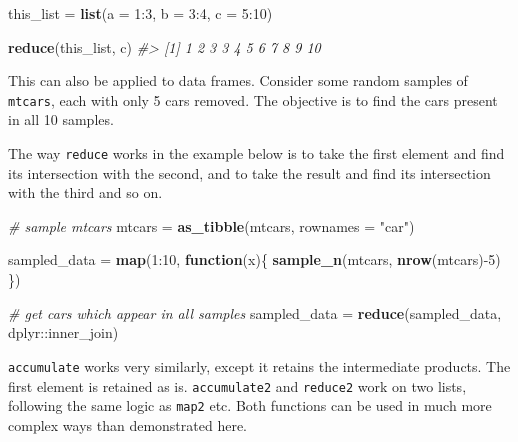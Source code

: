 \documentclass[]{book}
\newenvironment{Shaded}{}{}
\newcommand{\CommentTok}[1]{\textcolor[rgb]{0.38,0.63,0.69}{\textit{#1}}}
\newcommand{\ControlFlowTok}[1]{\textcolor[rgb]{0.00,0.44,0.13}{\textbf{#1}}}
\newcommand{\DataTypeTok}[1]{\textcolor[rgb]{0.56,0.13,0.00}{#1}}
\newcommand{\DecValTok}[1]{\textcolor[rgb]{0.25,0.63,0.44}{#1}}
\newcommand{\KeywordTok}[1]{\textcolor[rgb]{0.00,0.44,0.13}{\textbf{#1}}}
\newcommand{\NormalTok}[1]{#1}
\newcommand{\OperatorTok}[1]{\textcolor[rgb]{0.40,0.40,0.40}{#1}}
\newcommand{\StringTok}[1]{\textcolor[rgb]{0.25,0.44,0.63}{#1}}
\begin{document}
\begin{Shaded}
\begin{Highlighting}[]
\NormalTok{this_list =}\StringTok{ }\KeywordTok{list}\NormalTok{(}\DataTypeTok{a =} \DecValTok{1}\OperatorTok{:}\DecValTok{3}\NormalTok{, }\DataTypeTok{b =} \DecValTok{3}\OperatorTok{:}\DecValTok{4}\NormalTok{, }\DataTypeTok{c =} \DecValTok{5}\OperatorTok{:}\DecValTok{10}\NormalTok{)}

\KeywordTok{reduce}\NormalTok{(this_list, c)}
\CommentTok{#>  [1]  1  2  3  3  4  5  6  7  8  9 10}
\end{Highlighting}
\end{Shaded}

This can also be applied to data frames. Consider some random samples of \texttt{mtcars}, each with only 5 cars removed. The objective is to find the cars present in all 10 samples.

The way \texttt{reduce} works in the example below is to take the first element and find its intersection with the second, and to take the result and find its intersection with the third and so on.

\begin{Shaded}
\begin{Highlighting}[]
\CommentTok{# sample mtcars}
\NormalTok{mtcars =}\StringTok{ }\KeywordTok{as_tibble}\NormalTok{(mtcars, }\DataTypeTok{rownames =} \StringTok{"car"}\NormalTok{)}

\NormalTok{sampled_data =}\StringTok{ }\KeywordTok{map}\NormalTok{(}\DecValTok{1}\OperatorTok{:}\DecValTok{10}\NormalTok{, }\ControlFlowTok{function}\NormalTok{(x)\{}
  \KeywordTok{sample_n}\NormalTok{(mtcars, }\KeywordTok{nrow}\NormalTok{(mtcars)}\OperatorTok{-}\DecValTok{5}\NormalTok{)}
\NormalTok{  \})}

\CommentTok{# get cars which appear in all samples}
\NormalTok{sampled_data =}\StringTok{ }\KeywordTok{reduce}\NormalTok{(sampled_data,}
\NormalTok{                      dplyr}\OperatorTok{::}\NormalTok{inner_join)}
\end{Highlighting}
\end{Shaded}

\texttt{accumulate} works very similarly, except it retains the intermediate products. The first element is retained as is. \texttt{accumulate2} and \texttt{reduce2} work on two lists, following the same logic as \texttt{map2} etc.
Both functions can be used in much more complex ways than demonstrated here.
\end{document}
